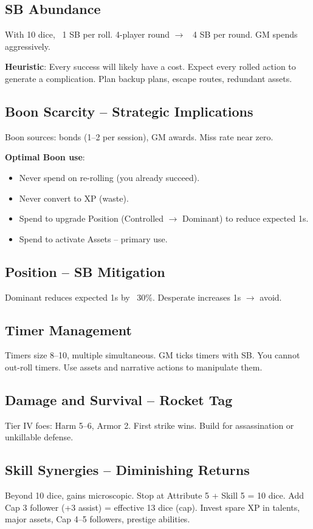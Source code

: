 \documentclass[11pt]{article}
\begin{document}
\subsection{SB Abundance}
With 10 dice, ~1 SB per roll. 4-player round $\rightarrow$ ~4 SB per round. GM spends aggressively.

\textbf{Heuristic}: Every success will likely have a cost. Expect every rolled action to generate a complication. Plan backup plans, escape routes, redundant assets.

\subsection{Boon Scarcity -- Strategic Implications}
Boon sources: bonds (1--2 per session), GM awards. Miss rate near zero.

\textbf{Optimal Boon use}:
\begin{itemize}
    \item Never spend on re-rolling (you already succeed).
    \item Never convert to XP (waste).
    \item Spend to upgrade Position (Controlled $\rightarrow$ Dominant) to reduce expected 1s.
    \item Spend to activate Assets -- primary use.
\end{itemize}

\subsection{Position -- SB Mitigation}
Dominant reduces expected 1s by ~30\%. Desperate increases 1s $\rightarrow$ avoid.

\subsection{Timer Management}
Timers size 8--10, multiple simultaneous. GM ticks timers with SB. You cannot out-roll timers. Use assets and narrative actions to manipulate them.

\subsection{Damage and Survival -- Rocket Tag}
Tier IV foes: Harm 5--6, Armor 2. First strike wins. Build for assassination or unkillable defense.

\subsection{Skill Synergies -- Diminishing Returns}
Beyond 10 dice, gains microscopic. Stop at Attribute 5 + Skill 5 = 10 dice. Add Cap 3 follower (+3 assist) = effective 13 dice (cap). Invest spare XP in talents, major assets, Cap 4--5 followers, prestige abilities.
\end{document}
